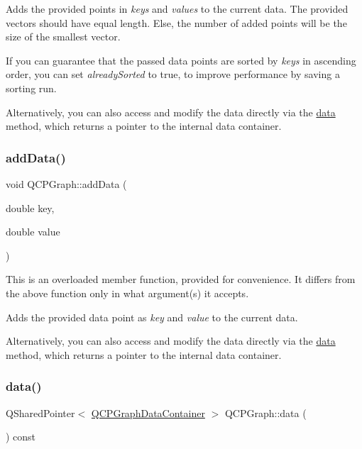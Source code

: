 Adds the provided points in {\itshape keys} and {\itshape values} to the current data. The provided vectors should have equal length. Else, the number of added points will be the size of the smallest vector.

If you can guarantee that the passed data points are sorted by {\itshape keys} in ascending order, you can set {\itshape already\+Sorted} to true, to improve performance by saving a sorting run.

Alternatively, you can also access and modify the data directly via the \hyperlink{class_q_c_p_graph_a141aa31a1f19bbd0ce60f55eaeb9ea60}{data} method, which returns a pointer to the internal data container. \mbox{\label{class_q_c_p_graph_a0bf98b1972286cfb7b1c4b7dd6ae2012}} 
\subsubsection{\texorpdfstring{add\+Data()}{addData()}\hspace{0.1cm}{\footnotesize\ttfamily [2/2]}}
{\footnotesize\ttfamily void Q\+C\+P\+Graph\+::add\+Data (\begin{DoxyParamCaption}\item[{double}]{key,  }\item[{double}]{value }\end{DoxyParamCaption})}

This is an overloaded member function, provided for convenience. It differs from the above function only in what argument(s) it accepts.

Adds the provided data point as {\itshape key} and {\itshape value} to the current data.

Alternatively, you can also access and modify the data directly via the \hyperlink{class_q_c_p_graph_a141aa31a1f19bbd0ce60f55eaeb9ea60}{data} method, which returns a pointer to the internal data container. \mbox{\label{class_q_c_p_graph_a141aa31a1f19bbd0ce60f55eaeb9ea60}} 
\subsubsection{\texorpdfstring{data()}{data()}}
{\footnotesize\ttfamily Q\+Shared\+Pointer$<$ \hyperlink{class_q_c_p_data_container}{Q\+C\+P\+Graph\+Data\+Container} $>$ Q\+C\+P\+Graph\+::data (\begin{DoxyParamCaption}{ }\end{DoxyParamCaption}) const\hspace{0.3cm}{\ttfamily [inline]}}

